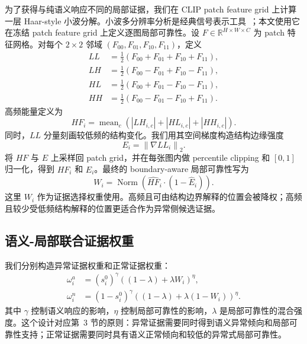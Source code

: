 为了获得与纯语义响应不同的局部证据，我们在 CLIP patch feature grid 上计算一层 Haar-style 小波分解。小波多分辨率分析是经典信号表示工具~\cite{daubechies1988orthonormal,mallat1989theory}；本文使用它在冻结 patch feature grid 上定义逐图局部可靠性。设 $F\in\mathbb{R}^{H\times W\times C}$ 为 patch 特征网格。对每个 $2\times2$ 邻域 $(F_{00},F_{01},F_{10},F_{11})$，定义
\begin{align}
  LL &= \frac{1}{2}(F_{00}+F_{01}+F_{10}+F_{11}),\\
  LH &= \frac{1}{2}(F_{00}-F_{01}+F_{10}-F_{11}),\\
  HL &= \frac{1}{2}(F_{00}+F_{01}-F_{10}-F_{11}),\\
  HH &= \frac{1}{2}(F_{00}-F_{01}-F_{10}+F_{11}).
\end{align}
高频能量定义为
\begin{equation}
  HF_i = \operatorname{mean}_{c}\left(|LH_{i,c}|+|HL_{i,c}|+|HH_{i,c}|\right).
\end{equation}
同时，$LL$ 分量刻画较低频的结构变化。我们用其空间梯度构造结构边缘强度
\begin{equation}
  E_i = \left\|\nabla LL_i\right\|_2.
\end{equation}
将 $HF$ 与 $E$ 上采样回 patch grid，并在每张图内做 percentile clipping 和 $[0,1]$ 归一化，得到 $\widehat{HF}_i$ 和 $\widehat{E}_i$。最终的 boundary-aware 局部可靠性写为
\begin{equation}
  W_i = \operatorname{Norm}\left(\widehat{HF}_i \cdot (1-\widehat{E}_i)\right).
  \label{eq:wavelet-reliability}
\end{equation}
这里 $W_i$ 作为证据选择权重使用。高频且可由结构边界解释的位置会被降权；高频且较少受低频结构解释的位置更适合作为异常侧候选证据。

\subsection{语义-局部联合证据权重}

我们分别构造异常证据权重和正常证据权重：
\begin{align}
  \omega_i^{a}
  &=
  (s_i^0)^\gamma
  \left((1-\lambda)+\lambda W_i\right)^\eta,\\
  \omega_i^{n}
  &=
  (1-s_i^0)^\gamma
  \left((1-\lambda)+\lambda(1-W_i)\right)^\eta.
  \label{eq:evidence-weights}
\end{align}
其中 $\gamma$ 控制语义响应的影响，$\eta$ 控制局部可靠性的影响，$\lambda$ 是局部可靠性的混合强度。这个设计对应第~3 节的原则：异常证据需要同时得到语义异常倾向和局部可靠性支持；正常证据需要同时具有语义正常倾向和较低的异常式局部可靠性。

